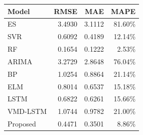 {\tiny\setlength{\tabcolsep}{2pt}\begin{tabular}{lrrr} \toprule
Model & RMSE & MAE & MAPE \\ \midrule
ES & 3.4930 & 3.1112 & 81.60\% \\ 
SVR & 0.6092 & 0.4189 & 12.14\% \\ 
RF & 0.1654 & 0.1222 & 2.53\% \\ 
ARIMA & 3.2729 & 2.8648 & 76.04\% \\ 
BP & 1.0254 & 0.8864 & 21.14\% \\ 
ELM & 0.8014 & 0.6537 & 15.18\% \\ 
LSTM & 0.6822 & 0.6261 & 15.66\% \\ 
VMD-LSTM & 1.0744 & 0.9782 & 21.00\% \\ 
Proposed & 0.4471 & 0.3501 & 8.86\% \\ 
\bottomrule \end{tabular}}
